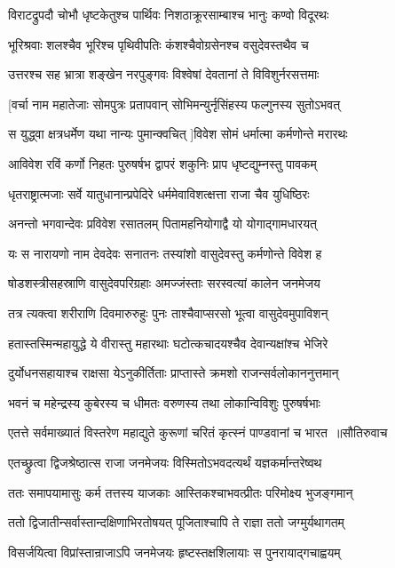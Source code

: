 \twolineshloka
{विराटद्रुपदौ चोभौ धृष्टकेतुश्च पार्थिवः}
{निशठाक्रूरसाम्बाश्च भानुः कण्वो विदूरथः}


\twolineshloka
{भूरिश्रवाः शलश्चैव भूरिश्च पृथिवीपतिः}
{कंशश्चैवोग्रसेनश्च वसुदेवस्तथैव च}


\twolineshloka
{उत्तरश्च सह भ्रात्रा शङ्खेन नरपुङ्गवः}
{विश्वेषां देवतानां ते विविशुर्नरसत्तमाः}


\twolineshloka
{[वर्चा नाम महातेजाः सोमपुत्रः प्रतापवान्}
{सोभिमन्युर्नृसिंहस्य फल्गुनस्य सुतोऽभवत्}


\twolineshloka
{स युद्ध्वा क्षत्रधर्मेण यथा नान्यः पुमान्क्वचित्}
{]विवेश सोमं धर्मात्मा कर्मणोन्ते मरारथः}


\twolineshloka
{आविवेश रविं कर्णो निहतः पुरुषर्षभ}
{द्वापरं शकुनिः प्राप धृष्टद्युम्नस्तु पावकम्}


\twolineshloka
{धृतराष्ट्रात्मजाः सर्वे यातुधानान्प्रपेदिरे}
{धर्ममेवाविशत्क्षत्ता राजा चैव युधिष्ठिरः}


\twolineshloka
{अनन्तो भगवान्देवः प्रविवेश रसातलम्}
{पितामहनियोगाद्वै यो योगाद्गामधारयत्}


\twolineshloka
{यः स नारायणो नाम देवदेवः सनातनः}
{तस्यांशो वासुदेवस्तु कर्मणोन्ते विवेश ह}


\twolineshloka
{षोडशस्त्रीसहस्राणि वासुदेवपरिग्रहाः}
{अमज्जंस्ताः सरस्वत्यां कालेन जनमेजय}


\twolineshloka
{तत्र त्यक्त्वा शरीराणि दिवमारुरुहुः पुनः}
{ताश्चैवाप्सरसो भूत्वा वासुदेवमुपाविशन्}


\twolineshloka
{हतास्तस्मिन्महायुद्धे ये वीरास्तु महारथाः}
{घटोत्कचादयश्चैव देवान्यक्षांश्च भेजिरे}


\twolineshloka
{दुर्योधनसहायाश्च राक्षसा येऽनुकीर्तिताः}
{प्राप्तास्ते क्रमशो राजन्सर्वलोकाननुत्तमान्}


\twolineshloka
{भवनं च महेन्द्रस्य कुबेरस्य च धीमतः}
{वरुणस्य तथा लोकान्विविशुः पुरुषर्षभाः}


\threelineshloka
{एतत्ते सर्वमाख्यातं विस्तरेण महाद्युते}
{कुरूणां चरितं कृत्स्नं पाण्डवानां च भारत ॥सौतिरुवाच}
{}


\twolineshloka
{एतच्छ्रुत्वा द्विजश्रेष्ठात्स राजा जनमेजयः}
{विस्मितोऽभवदत्यर्थं यज्ञकर्मान्तरेष्वथ}


\twolineshloka
{ततः समापयामासुः कर्म तत्तस्य याजकाः}
{आस्तिकश्चाभवत्प्रीतः परिमोक्ष्य भुजङ्गमान्}


\twolineshloka
{ततो द्विजातीन्सर्वास्तान्दक्षिणाभिरतोषयत्}
{पूजिताश्चापि ते राज्ञा ततो जग्मुर्यथागतम्}


\twolineshloka
{विसर्जयित्वा विप्रांस्तान्राजाऽपि जनमेजयः}
{हृष्टस्तक्षशिलायाः स पुनरायाद्गचाह्वयम्}


